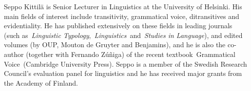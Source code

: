 \begin{refsection}
Seppo Kittilä is Senior Lecturer in Linguistics at the University of Helsinki. His main fields of interest include transitivity, grammatical voice, ditransitives and evidentiality. He has published extensively on these fields in leading journals (such as \emph{Linguistic Typology}, \emph{Linguistics} and \emph{Studies in Language}), and edited volumes (by OUP, Mouton de Gruyter and Benjamins), and he is also the co-author (together with Fernando Zúñiga) of the recent textbook Grammatical Voice (Cambridge University Press). Seppo is a member of the Swedish Research Council’s evaluation panel for linguistics and he has received major grants from the Academy of Finland.


\end{refsection}

